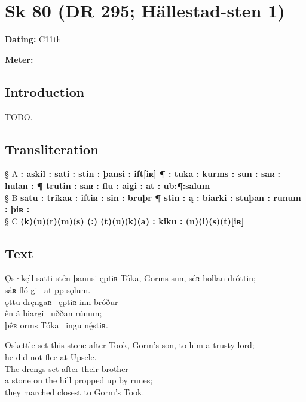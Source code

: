 \section{Sk 80 (DR 295; Hällestad-sten 1)}

\begin{flushright}%
\textbf{Dating:} C11th

\textbf{Meter:} \Fornyrdislag
\end{flushright}%

\subsection{Introduction}

TODO.

\subsection{Transliteration}

§ A \textbf{: askil : sati : stin : þansi : ift[iʀ] ¶ : tuka : kurms : sun : saʀ : hulan : ¶ trutin : saʀ : flu : aigi : at : ub:¶:salum} \\
§ B \textbf{satu : trikaʀ : iftiʀ : sin : bruþr ¶ stin : ą : biarki : stuþan : runum : þiʀ :} \\
§ C \textbf{(k)(u)(r)(m)(s) (:) (t)(u)(k)(a) : kiku : (n)(i)(s)(t)[iʀ]}

\subsection{Text}

\bpg\bpa[0]%
\startsub Ǫ̇s·kęll satti stên þannsi ęptiʀ Tóka, Gorms sun, séʀ hollan dróttin;\endsub \\
sáʀ fló gi \hld\ at pp-sǫlum. \\
ǫttu dręngaʀ \hld\ ęptiʀ inn bróður \\
ên ȧ biargi \hld\ uððan ru̇num; \\
þêʀ orms Tóka \hld\ ingu nę́stiʀ. \epa

\bpb Oskettle set this stone after Took, Gorm’s son, to him a trusty lord; \\
he did not flee at Upsele. \\
The drengs set after their brother \\
a stone on the hill propped up by runes; \\
they marched closest to Gorm’s Took.\epb\epg

